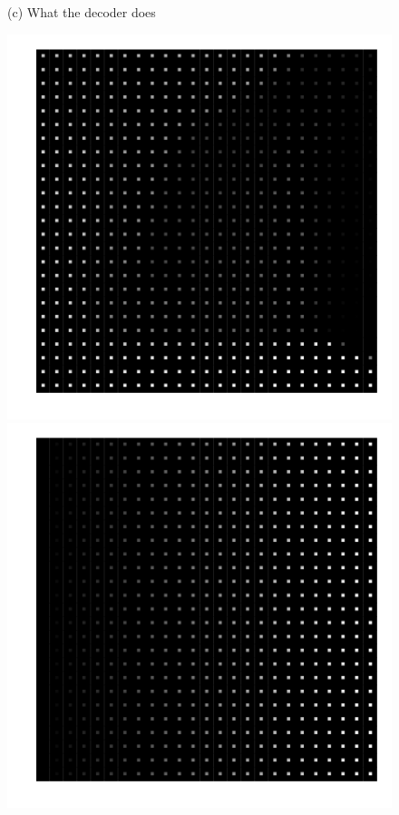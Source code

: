 \documentclass{article}
\begin{document}
\begin{figure}[t!]
\begin{minipage}{.315\textwidth}
	\end{minipage}%
	\begin{minipage}{.315\textwidth}
		\centering
		(c) What the decoder does
		
		\includegraphics[width=\textwidth]{deterministic_decoder}

		\includegraphics[width=\textwidth]{random_decoder}
		

\end{minipage}
\end{figure}
\end{document}

